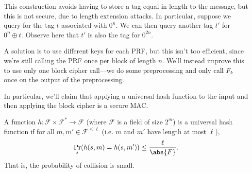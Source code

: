 \begin{center}
\end{center}

This construction avoids having to store a tag equal in length to the message, but this is not secure, due to length extension attacks. In particular, suppose we query for the tag $t$ associated with $0^n$. We can then query another tag $t'$ for $0^n \oplus t$. Observe here that $t'$ is also the tag for $0^{2n}$.

A solution is to use different keys for each PRF, but this isn't too efficient, since we're still calling the PRF once per block of length $n$. We'll instead improve this to use only one block cipher call---we do some preprocessing and only call $F_k$ once on the output of the preprocessing.

In particular, we'll claim that applying a universal hash function to the input and then applying the block cipher is a secure MAC.

\begin{definition}
    A function $h : \mathcal{F} \times \mathcal{F}^* \to \mathcal{F}$ (where $\mathcal{F}$ is a field of size $2^m$) is a universal hash function if for all $m, m' \in \mathcal{F}^{\le \ell}$ (i.e. $m$ and $m'$ have length at most $\ell$),
    \[
        \Pr_s(h(s, m) = h(s, m')) \le \frac{\ell}{\abs{F}}
    .\]
    That is, the probability of collision is small.
\end{definition}

